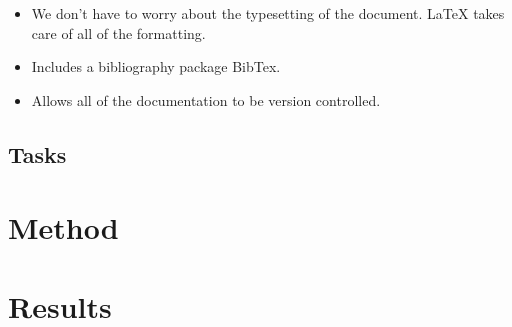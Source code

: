 \documentclass[a4paper,11pt]{article}
\begin{document}
\begin{itemize}
  \item We don't have to worry about the typesetting of the document. \LaTeX{}
    takes care of all of the formatting.
  \item Includes a bibliography package BibTex.
  \item Allows all of the documentation to be version controlled.
\end{itemize}

\subsection{Tasks}

\section{Method}

\section{Results}
\end{document}
